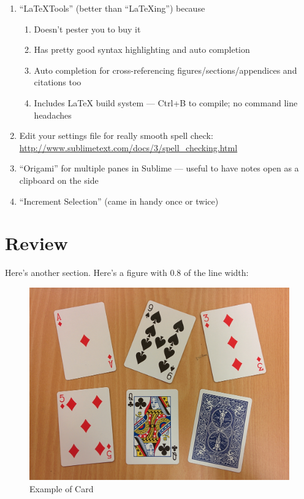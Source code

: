 \documentclass[a4paper,12pt,notitlepage]{article}
\begin{document}
		\begin{enumerate}
			\item ``LaTeXTools'' (better than ``LaTeXing'') because
			\begin{enumerate}
				\item Doesn't pester you to buy it
				\item Has pretty good syntax highlighting and auto completion
				\item Auto completion for cross-referencing figures/sections/appendices and citations too
				\item Includes LaTeX build system --- Ctrl+B to compile; no command line headaches
			\end{enumerate}
			\item Edit your settings file for really smooth spell check: \url{http://www.sublimetext.com/docs/3/spell_checking.html}
			\item ``Origami'' for multiple panes in Sublime --- useful to have notes open as a clipboard on the side
			\item ``Increment Selection'' (came in handy once or twice)
		\end{enumerate}

\pagebreak

\section{Review}
\label{sec:review}

	Here's another section. Here's a figure with 0.8 of the line width:

	\begin{figure}[ht]
		\centering
		\includegraphics[width=0.8\linewidth]{mixed}
		\caption{Example of Card}
		\label{fig:mixed}
	\end{figure}
\end{document}

